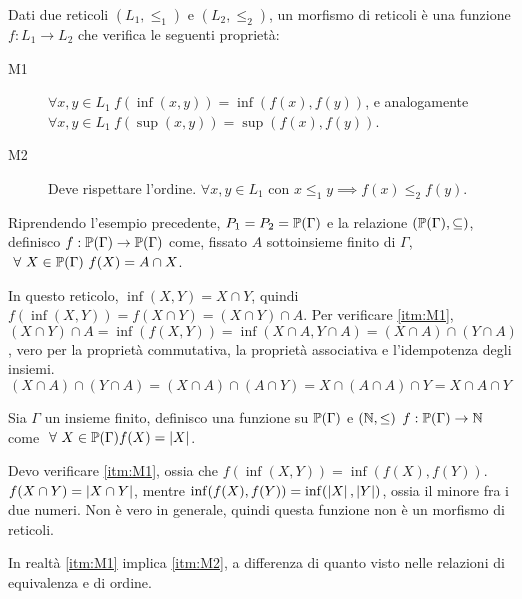 \begin{defn}
Dati due reticoli $(L_1, \le_1)$ e $(L_2, \le_2)$, un morfismo di reticoli \`e una funzione $f : L_1 \to L_2$ che verifica le seguenti propriet\`a:
\begin{description}
  \item[M1\label{itm:M1}] $\forall x, y \in L_1 \ f(\inf(x,y)) = \inf(f(x),f(y))$, e analogamente $\forall x, y \in L_1 \ f(\sup(x,y)) = \sup(f(x),f(y))$.
  \item[M2\label{itm:M2}] Deve rispettare l'ordine. $\forall x, y \in L_1 $ con $x \le_1 y \implies f(x) \le_2 f(y)$.
\end{description}
\end{defn}

\begin{exmp}
Riprendendo l'esempio precedente, $P_1 = P_2 = \mathbb{P}(\Gamma)$ e la relazione $(\mathbb{P}(\Gamma), \subseteq)$, definisco $f : \mathbb{P}(\Gamma) \to \mathbb{P}(\Gamma)$ come, fissato $A$ sottoinsieme finito di $\Gamma$, $\forall X \in \parts(\Gamma) \ f(X) = A \cap X$.

In questo reticolo, $\inf(X,Y) = X \cap Y$, quindi $f(\inf(X,Y)) = f(X \cap Y) = (X \cap Y) \cap A$. Per verificare \ref{itm:M1}, $(X \cap Y) \cap A = \inf(f(X,Y)) = \inf(X \cap A, Y \cap A) = (X \cap A) \cap (Y \cap A)$, vero per la propriet\`a commutativa, la propriet\`a associativa e l'idempotenza degli insiemi.
\[
(X \cap A) \cap (Y \cap A) = (X \cap A) \cap (A \cap Y) = X \cap (A \cap A) \cap Y = X \cap A \cap Y
\]
\end{exmp}

\begin{exmp}\label{morfismo_no_reticoli}
Sia $\Gamma$ un insieme finito, definisco una funzione su $\mathbb{P}(\Gamma)$ e $(\mathbb{N}, \le)$ $f : \mathbb{P}(\Gamma) \to \mathbb{N}$ come $\forall X \in \parts(\Gamma) f(X) = \abs{X}$.

Devo verificare \ref{itm:M1}, ossia che $f(\inf(X,Y)) = \inf(f(X),f(Y))$. $f(X \cap Y) = \left\lvert{X \cap Y}\right\rvert$, mentre $\inf(f(X),f(Y)) = \inf(\left\lvert{X}\right\rvert,\left\lvert{Y}\right\rvert)$, ossia il minore fra i due numeri. Non \`e vero in generale, quindi questa funzione non \`e un morfismo di reticoli.
\end{exmp}

In realt\`a \ref{itm:M1} implica \ref{itm:M2}, a differenza di quanto visto nelle relazioni di equivalenza e di ordine.

